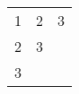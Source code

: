 \documentclass[a4paper, 12pt]{article}
\begin{document}
\begin{center}
\begin{tabular}{c c c }
1&2&3\\ 
2&3&\\ 
3&&\\ 
\end{tabular}
\end{center}
\end{document}
